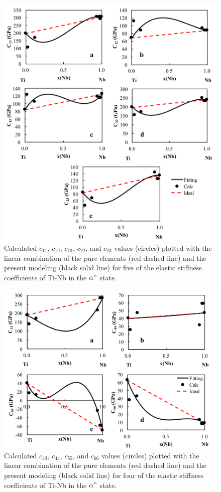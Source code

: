 \pagebreak
\begin{figure}[H]
	\centering
	\includegraphics[width=\textwidth]{Chapter-7/Figures/adpe1.png}
	\caption{Calculated $c_{11}$, $c_{12}$, $c_{13}$, $c_{22}$, and  $c_{23}$ values (circles) plotted with the linear combination of the pure elements (red dashed line) and the present modeling (black solid line) for five of the elastic stiffness coefficients of Ti-Nb in the $\alpha"$ state.}
	\label{Ch7-figure:adpelas1}
\end{figure}

\pagebreak
\begin{figure}[H]
	\centering
	\includegraphics[width=\textwidth]{Chapter-7/Figures/adpe2.png}
	\caption{Calculated $c_{33}$, $c_{44}$, $c_{55}$, and $c_{66}$ values (circles) plotted with the linear combination of the pure elements (red dashed line) and the present modeling (black solid line) for four of the elastic stiffness coefficients of Ti-Nb in the $\alpha"$ state.}
	\label{Ch7-figure:adpelas2}
\end{figure}

